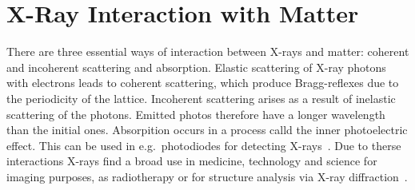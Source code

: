  
\section{X-Ray Interaction with Matter}\label{sec:Q2}

There are three essential ways of interaction between X-rays and matter: coherent and incoherent scattering and absorption. Elastic scattering of X-ray photons with electrons leads to coherent scattering, which produce Bragg-reflexes due to the periodicity of the lattice. Incoherent scattering arises as a result of inelastic scattering of the photons. Emitted photos therefore have a longer wavelength than the initial ones. Absorpition occurs in a process calld the inner photoelectric effect. This can be used in e.g.~photodiodes for detecting X-rays~\cite{Bohm.2021}. Due to therse interactions X-rays find a broad use in medicine, technology and science for imaging purposes, as radiotherapy or for structure analysis via X-ray diffraction~\cite{Lewis.1997}.